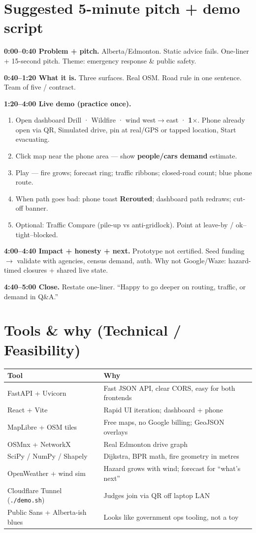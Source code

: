 \documentclass[10pt]{extarticle}
\begin{document}
\section{Suggested 5-minute pitch + demo script}
\textbf{0:00--0:40 Problem + pitch.} Alberta/Edmonton. Static advice fails. One-liner + 15-second pitch. Theme: emergency response \& public safety.

\textbf{0:40--1:20 What it is.} Three surfaces. Real OSM. Road rule in one sentence. Team of five / contract.

\textbf{1:20--4:00 Live demo (practice once).}
\begin{enumerate}
\item Open dashboard Drill · Wildfire · wind west$\rightarrow$east · \textbf{1$\times$}. Phone already open via QR, Simulated drive, pin at real/GPS or tapped location, Start evacuating.
\item Click map near the phone area --- show \textbf{people/cars demand} estimate.
\item Play --- fire grows; forecast ring; traffic ribbons; closed-road count; blue phone route.
\item When path goes bad: phone toast \textbf{Rerouted}; dashboard path redraws; cut-off banner.
\item Optional: Traffic Compare (pile-up vs anti-gridlock). Point at leave-by / ok--tight--blocked.
\end{enumerate}

\textbf{4:00--4:40 Impact + honesty + next.} Prototype not certified. Seed funding $\rightarrow$ validate with agencies, census demand, auth. Why not Google/Waze: hazard-timed closures + shared live state.

\textbf{4:40--5:00 Close.} Restate one-liner. ``Happy to go deeper on routing, traffic, or demand in Q\&A.''

\section{Tools \& why (Technical / Feasibility)}
\begin{tabularx}{\textwidth}{@{}lX@{}}
\toprule
\textbf{Tool} & \textbf{Why} \\
\midrule
FastAPI + Uvicorn & Fast JSON API, clear CORS, easy for both frontends \\
React + Vite & Rapid UI iteration; dashboard + phone \\
MapLibre + OSM tiles & Free maps, no Google billing; GeoJSON overlays \\
OSMnx + NetworkX & Real Edmonton drive graph \\
SciPy / NumPy / Shapely & Dijkstra, BPR math, fire geometry in metres \\
OpenWeather + wind sim & Hazard grows with wind; forecast for ``what's next'' \\
Cloudflare Tunnel (\texttt{./demo.sh}) & Judges join via QR off laptop LAN \\
Public Sans + Alberta-ish blues & Looks like government ops tooling, not a toy \\
\bottomrule
\end{tabularx}
\end{document}
